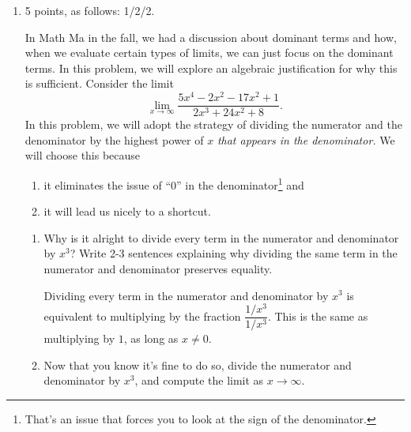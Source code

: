 \documentclass{article}
\begin{document}
\begin{enumerate}
\begin{enumerate}
  \end{enumerate}

\item 

\begin{grading}
5 points, as follows: 1/2/2.
\end{grading}

In Math Ma in the fall, we had a discussion about dominant terms and how, when we evaluate certain types of limits, we can just focus on the dominant terms. In this problem, we will explore an algebraic justification for why this is sufficient. Consider the limit
    \[ \lim_{x \to \infty} \frac{5x^4-2x^2-17x^2+1}{2x^3+24x^2+8}. \]
    In this problem, we will adopt the strategy of dividing
    the numerator and the denominator by the highest power of $x$ \emph{that
    appears in the denominator.} We will choose this because
    \begin{enumerate}[label=(\roman*)]
    \item it eliminates the issue of ``0'' in the denominator\footnote{
    That's an issue that forces you to look at the sign of the 
    denominator.} and
    \item it will lead us nicely to a shortcut.
    \end{enumerate}

    \begin{enumerate}[topsep=0pt]
    
      \item
        \begin{problem}[\vfill]
          Why is it alright to divide every term in the numerator and
          denominator by $x^3$? Write 2-3 sentences explaining why dividing the same term in the numerator and denominator preserves equality.
        \end{problem}

        \begin{solution}
          Dividing every term in the numerator and denominator by $x^3$
          is equivalent to multiplying by the fraction 
          $\dfrac{1/x^3}{1/x^3}$. This is the same as multiplying by $1$,
          as long as $x \neq 0$.
        \end{solution}

      \item
        \begin{problem}[\vfill]
          Now that you know it's fine to do so, divide the numerator
          and denominator by $x^3$, and compute the limit as $x \to 
          \infty$.
        \end{problem}


\end{enumerate}
\end{enumerate}
\end{document}
